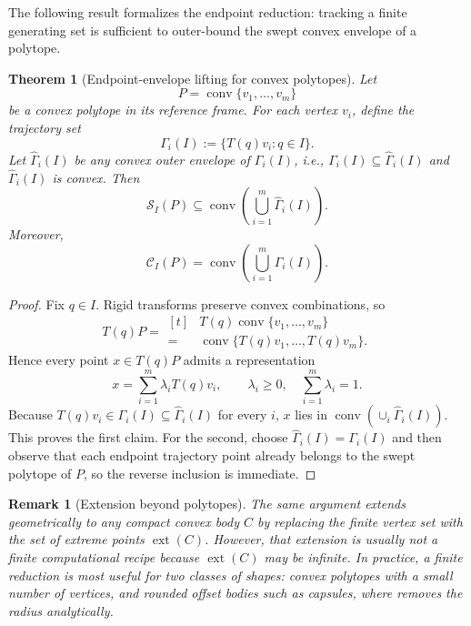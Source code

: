 \documentclass[journal]{IEEEtran}
\newtheorem{theorem}{Theorem}
\newtheorem{remark}{Remark}
\begin{document}
The following result formalizes the endpoint reduction: tracking a finite
generating set is sufficient to outer-bound the swept convex envelope of a
polytope.

\begin{theorem}[Endpoint-envelope lifting for convex polytopes]
\label{thm:vertex_lift}
Let
\[
P = \operatorname{conv}\{v_1,\dots,v_m\}
\]
be a convex polytope in its reference frame. For each vertex $v_i$, define the
trajectory set
\[
\Gamma_i(I) := \{T(q)v_i : q\in I\}.
\]
Let $\widehat{\Gamma}_i(I)$ be any convex outer envelope of $\Gamma_i(I)$, i.e.,
$\Gamma_i(I) \subseteq \widehat{\Gamma}_i(I)$ and
$\widehat{\Gamma}_i(I)$ is convex. Then
\[
\mathcal{S}_I(P)
\subseteq
\operatorname{conv}\left(\bigcup_{i=1}^m \widehat{\Gamma}_i(I)\right).
\]
Moreover,
\[
\mathcal{C}_I(P)
= \operatorname{conv}\left(\bigcup_{i=1}^m \Gamma_i(I)\right).
\]
\end{theorem}

\begin{proof}
Fix $q\in I$. Rigid transforms preserve convex combinations, so
\[
T(q)P
= \begin{aligned}[t]
&T(q)\operatorname{conv}\{v_1,\dots,v_m\} \\
=\;&\operatorname{conv}\{T(q)v_1,\dots,T(q)v_m\}.
\end{aligned}
\]
Hence every point $x \in T(q)P$ admits a representation
\[
x = \sum_{i=1}^m \lambda_i T(q)v_i,
\qquad \lambda_i\ge 0,
\quad \sum_{i=1}^m \lambda_i = 1.
\]
Because $T(q)v_i \in \Gamma_i(I) \subseteq \widehat{\Gamma}_i(I)$ for every $i$,
$x$ lies in $\operatorname{conv}(\cup_i \widehat{\Gamma}_i(I))$. This proves the
first claim. For the second, choose
$\widehat{\Gamma}_i(I)=\Gamma_i(I)$ and then observe that each endpoint
trajectory point already belongs to the swept polytope of $P$, so the reverse
inclusion is immediate.
\end{proof}

\begin{remark}[Extension beyond polytopes]\label{rem:general_convex}
The same argument extends geometrically to any compact convex body $C$ by
replacing the finite vertex set with the set of extreme points
$\operatorname{ext}(C)$. However, that extension is usually not a finite
computational recipe because $\operatorname{ext}(C)$ may be infinite. In
practice, a finite reduction is most useful for two classes of shapes: convex
polytopes with a small number of vertices, and rounded offset bodies such as
capsules, where  removes the radius analytically.
\end{remark}
\end{document}
